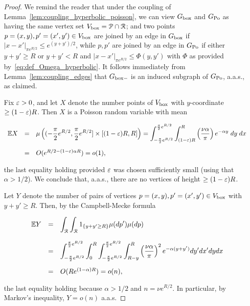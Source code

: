 \begin{proof}
We remind the reader that under the coupling of Lemma~\ref{lem:coupling_hyperbolic_poisson}, 
we can view $G_{\mathrm{box}}$ and $G_{{\mathrm{Po}}}$ as having the same vertex set $V_{\text{box}} = {\mathcal P} \cap {\mathcal R}$; and 
two points $p = (x,y), p' = (x',y') \in V_{\text{box}}$ are joined by an edge in $G_{\mathrm{box}}$ if 
$|x-x'|_{\pi e^{R/2}} \leq e^{(y+y')/2}$, while $p,p'$ are joined by an edge in $G_{{\mathrm{Po}}}$ 
if either $y+y'\geq R$ or $y+y'<R$ and $|x-x'|_{\pi e^{R/2}} \leq \Phi(y,y')$ with $\Phi$ as provided by~\eqref{eq:def_Omega_hyperbolic}.
It follows immediately from Lemma~\ref{lem:coupling_edges} that $G_{\mathrm{box}-}$ is an induced subgraph of $G_{{\mathrm{Po}}}$, a.a.s., as claimed.

Fix $\varepsilon > 0$, and let $X$ denote the number points of $V_{\text{box}}$ with $y$-coordinate $\geq (1-\varepsilon) R$. 
Then $X$ is a Poisson random variable with mean

$$ \begin{array}{rcl} 
{\mathbb E} X 
& = & \displaystyle \mu\left( (-\frac{\pi}{2} e^{R/2},\frac{\pi}{2} e^{R/2}] \times [(1-\varepsilon) R,R] \right)
= \int_{-\frac{\pi}{2} e^{R/2}}^{\frac{\pi}{2} e^{R/2}}\int_{(1-\varepsilon)R}^R \left(\frac{\nu\alpha}{\pi}\right) e^{-\alpha y}\;dy\;dx \\[4ex]
& = & O( e^{R/2-(1-\varepsilon)\alpha R} ) = o(1), 
\end{array} $$

\noindent
the last equality holding provided $\varepsilon$ was chosen sufficiently small (using that $\alpha > 1/2$).
We conclude that, a.a.s., there are no vertices of height $\geq (1-\varepsilon) R$.

Let $Y$ denote the number of pairs of vertices $p = (x,y), p'=(x',y') \in V_{\text{box}}$ with $y+y' \geq R$.
Then, by the Campbell-Mecke formula

$$ \begin{array}{rcl} {\mathbb E} Y 
& = & \displaystyle
\int_{{\mathcal R}}\int_{{\mathcal R}} 1_{\{y+y'\geq R\}} \mu(dp')\mu(dp) \\[4ex]
& = & \displaystyle
\int_{-\frac{\pi}{2}e^{R/2}}^{\frac{\pi}{2}e^{R/2}}\int_0^R
\int_{-\frac{\pi}{2}e^{R/2}}^{\frac{\pi}{2}e^{R/2}}\int_{R-y}^R \left(\frac{\nu\alpha}{\pi}\right)^2 e^{-\alpha(y+y')}dy'dx'dydx \\[4ex]
& = & O( R e^{(1-\alpha)R} ) = o( n ),
\end{array} $$

\noindent
the last equality holding because $\alpha > 1/2$ and $n = \nu e^{R/2}$.
In particular, by Markov's inequality, $Y = o(n)$ a.a.s.


\end{proof}
